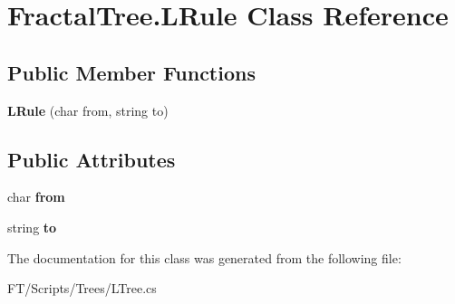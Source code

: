 \hypertarget{class_fractal_tree_1_1_l_rule}{}\section{Fractal\+Tree.\+L\+Rule Class Reference}
\label{class_fractal_tree_1_1_l_rule}
\subsection*{Public Member Functions}
\begin{DoxyCompactItemize}
\item 
\mbox{\label{class_fractal_tree_1_1_l_rule_a35f380166641f36ee4290895cecc4583}} 
{\bfseries L\+Rule} (char from, string to)
\end{DoxyCompactItemize}
\subsection*{Public Attributes}
\begin{DoxyCompactItemize}
\item 
\mbox{\label{class_fractal_tree_1_1_l_rule_aa08500e91663051c5da038421de7a5d5}} 
char {\bfseries from}
\item 
\mbox{\label{class_fractal_tree_1_1_l_rule_aaa28686eef06632f5c6b0d71ff7c615e}} 
string {\bfseries to}
\end{DoxyCompactItemize}


The documentation for this class was generated from the following file\+:\begin{DoxyCompactItemize}
\item 
F\+T/\+Scripts/\+Trees/L\+Tree.\+cs\end{DoxyCompactItemize}
